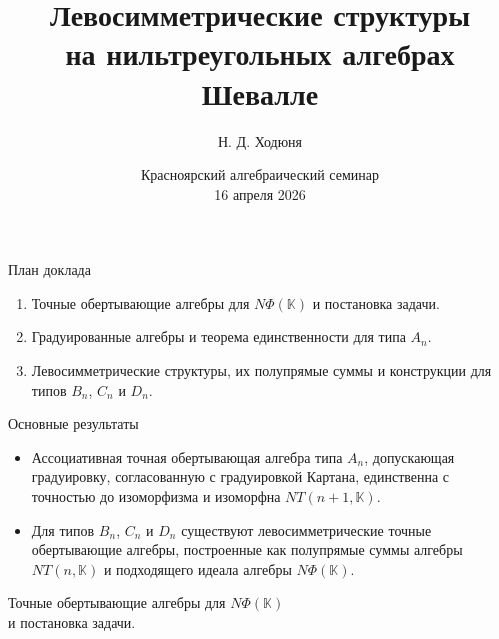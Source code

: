\documentclass[12pt,aspectratio=169]{beamer}
\title[Левосимметрические структуры на $N\Phi(\K)$]{Левосимметрические структуры\\ на нильтреугольных алгебрах Шевалле}
\author[Н. Д. Ходюня]{Н. Д. Ходюня}
\institute[СФУ]{Сибирский Федеральный Университет}
\date[12.04.2026]{Красноярский алгебраический семинар\\16 апреля 2026}
\newcommand{\K}{\mathbb{K}}
\begin{document}
\begin{frame}[plain]
    \vfill
    \begin{center}
        {\inserttitle\par}
        \vspace{1.6em}
        {\insertauthor\par}
        \vspace{0.4em}
        {\insertinstitute\par}
    \end{center}
    \vfill
    \begin{center}
        {\insertdate\par}
    \end{center}
\end{frame}

\begin{frame}[t]{План доклада}
    \begin{enumerate}
        \item Точные обертывающие алгебры для $N\Phi(\K)$ и постановка задачи.
        \item Градуированные алгебры и теорема единственности для типа $A_n$.
        \item Левосимметрические структуры, их полупрямые суммы и конструкции для типов
              $B_n$, $C_n$ и $D_n$.
    \end{enumerate}

    \medskip

    \begin{alertblock}{Основные результаты}
        \begin{itemize}
            \item Ассоциативная точная обертывающая алгебра типа $A_n$, допускающая градуировку,
                  согласованную с градуировкой Картана, единственна с точностью до изоморфизма и
                  изоморфна $NT(n+1,\K)$.
            \item Для типов $B_n$, $C_n$ и $D_n$ существуют левосимметрические точные
                  обертывающие алгебры, построенные как полупрямые суммы алгебры
                  $NT(n,\mathbb{K})$ и подходящего идеала алгебры $N\Phi(\mathbb{K})$.
        \end{itemize}
    \end{alertblock}
\end{frame}

\begin{frame}[plain]
    \vfill
    \begin{center}
        {Точные обертывающие алгебры для $N\Phi(\K)$\\ и постановка задачи.\par}
    \end{center}
    \vfill
\end{frame}
\end{document}
